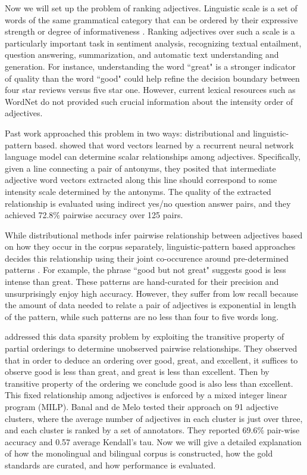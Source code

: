 Now we will set up the problem of ranking adjectives. Linguistic scale is a set of words of the same grammatical category that can be ordered by their expressive strength or degree of informativeness \cite{sheinman2009adjscales}. Ranking adjectives over such a scale is a particularly important task in sentiment analysis, recognizing textual entailment, question answering, summarization, and automatic text understanding and generation. For instance, understanding the word ``great" is a stronger indicator of quality than the word ``good" could help refine the decision boundary between four star reviews versus five star one. However, current lexical resources such as WordNet do not provided such crucial information about the intensity order of adjectives.

Past work approached this problem in two ways: distributional and linguistic-pattern based.  showed that word vectors learned by a recurrent neural network language model can determine scalar relationships among adjectives. Specifically, given a line connecting a pair of antonyms, they posited that intermediate adjective word vectors extracted along this line should correspond to some intensity scale determined by the antonyms. The quality of the extracted relationship is evaluated using indirect yes/no question answer pairs, and they achieved 72.8\% pairwise accuracy over 125 pairs.

While distributional methods infer pairwise relationship between adjectives based on how they occur in the corpus separately, linguistic-pattern based approaches decides this relationship using their joint co-occurence around pre-determined patterns \cite{sheinman2009adjscales,schulam2010automatically,sheinman2012refining} . For example, the phrase ``good but not great" suggests good is less intense than great. These patterns are hand-curated for their precision and unsurprisingly enjoy high accuracy. However, they suffer from low recall because the amount of data needed to relate a pair of adjectives is exponential in length of the pattern, while such patterns are no less than four to five words long. 

 addressed this data sparsity problem by exploiting the transitive property of partial orderings to determine unobserved pairwise relationships. They observed that in order to deduce an ordering over good, great, and excellent, it suffices to observe good is less than great, and great is less than excellent. Then by transitive property of the ordering we conclude good is also less than excellent. This fixed relationship among adjectives is enforced by a mixed integer linear program (MILP). Banal and de Melo tested their approach on 91 adjective clusters, where the average number of adjectives in each cluster is just over three, and each cluster is ranked by a set of annotators. They reported 69.6\% pair-wise accuracy and 0.57 average Kendall's tau. Now we will give a detailed explanation of how the monolingual and bilingual corpus is constructed, how the gold standards are curated, and how performance is evaluated.\newpage
